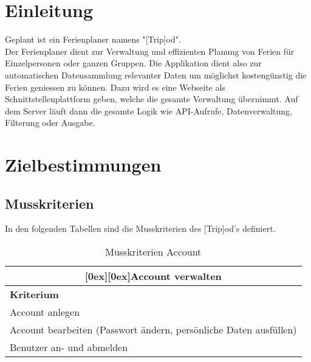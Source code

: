 \documentclass[10pt,a4paper,titlepage,twoside,german]{zhawreprt}
\newcommand{\tableheader}[2]{\multicolumn{#1}{c}{\raisebox{-0.3em}[0ex][0ex]{\large{\textbf{#2}}}}}
\begin{document}
\maketitle

\tableofcontents

\chapter{Einleitung}\label{chp:Introduction}
Geplant ist ein Ferienplaner namens "[Trip]od".\\
Der Ferienplaner dient zur Verwaltung und effizienten Planung von Ferien für Einzelpersonen oder ganzen Gruppen. Die Applikation dient also zur automatischen Datensammlung relevanter Daten um möglichst kostengünstig die Ferien geniessen zu können. Dazu wird es eine Webseite als Schnittstellenplattform geben, welche die gesamte Verwaltung übernimmt. Auf dem Server läuft dann die gesamte Logik wie API-Aufrufe, Datenverwaltung, Filterung oder Ausgabe.
\chapter{Zielbestimmungen}\label{chp:DefinitionOfGoals}
\section{Musskriterien}\label{sec:MustCriteria}
In den folgenden Tabellen sind die Musskriterien des [Trip]od's definiert.
\begin{table}[ht]\centering
\begin{tabular}{l}\hline
\tableheader{1}{Account verwalten}\\[0.3em]\hline
\textbf{Kriterium}\\\hline
Account anlegen\\\hline
Account bearbeiten (Passwort ändern, persönliche Daten ausfüllen)\\\hline
Benutzer an- und abmelden\\\hline
\end{tabular}
\caption{Musskriterien Account}\label{tbl:MustAccount}
\end{table}
\end{document}
